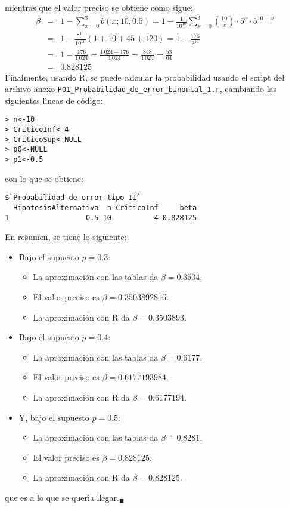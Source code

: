\begin{solucion}
\begin{enumerate}
  mientras que el valor preciso se obtiene como sigue:
  \begin{eqnarray*}
   \beta & = & 1 - \sum_{x=0}^3 b(x;10,0.5) = 1 - \frac{1}{10^{10}} \sum_{x = 0}^{3} \binom{10}{x} \cdot 5^x \cdot 5^{10-x} \\
   & = & 1 - \frac{5^{10}}{10^{10}} (1 + 10 + 45 + 120) = 1 - \frac{176}{2^{10}} \\
   & = & 1 - \frac{176}{1\,024} = \frac{1\,024 - 176}{1\,024} = \frac{848}{1\,024} = \frac{53}{64} \\
   & = & 0.828125
  \end{eqnarray*}
  Finalmente, usando R, se puede calcular la probabilidad usando el script del archivo anexo \texttt{P01\_Probabilidad\_de\_error\_binomial\_1.r}, cambiando las siguientes l\'{\i}neas de c\'odigo:
  \begin{verbatim}
> n<-10
> CriticoInf<-4
> CriticoSup<-NULL
> p0<-NULL
> p1<-0.5
  \end{verbatim}
  \vspace{-0.5cm}
  con lo que se obtiene:
  \begin{verbatim}
$`Probabilidad de error tipo II`
  HipotesisAlternativa  n CriticoInf     beta
1                  0.5 10          4 0.828125
  \end{verbatim}
  \vspace{-0.5cm}
  En resumen, se tiene lo siguiente:
  \begin{itemize}
   \item Bajo el supuesto $p = 0.3$:
   \begin{itemize}
    \item La aproximaci\'on con las tablas da $\beta = 0.3504$.
    \item El valor preciso es $\beta = 0.3503892816$.
    \item La aproximaci\'on con R da $\beta = 0.3503893$.
   \end{itemize}

   \item Bajo el supuesto $p = 0.4$:
   \begin{itemize}
    \item La aproximaci\'on con las tablas da $\beta = 0.6177$.
    \item El valor preciso es $\beta = 0.6177193984$.
    \item La aproximaci\'on con R da $\beta = 0.6177194$.
   \end{itemize}

   \item Y, bajo el supuesto $p=0.5$:
   \begin{itemize}
    \item La aproximaci\'on con las tablas da $\beta = 0.8281$.
    \item El valor preciso es $\beta = 0.828125$.
    \item La aproximaci\'on con R da $\beta = 0.828125$.
   \end{itemize}
  \end{itemize}
  que es a lo que se quer\'{\i}a llegar.${}_{\blacksquare}$
 \end{enumerate}
\end{solucion}
